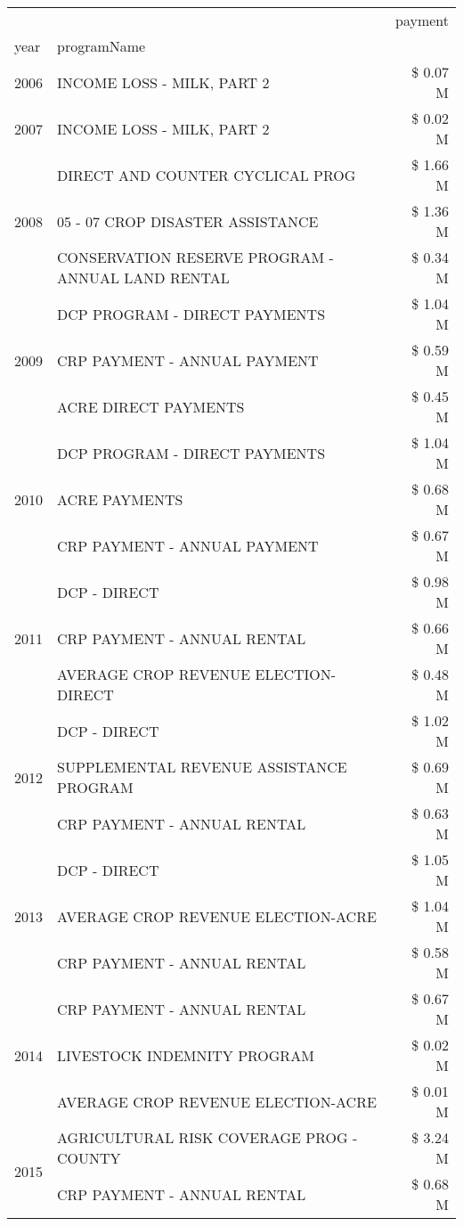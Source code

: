 \begin{tabular}{llr}
\toprule
 &  & payment \\
year & programName &  \\
\midrule
2006 & INCOME LOSS - MILK, PART 2 & \$ 0.07 M \\
\cline{1-3}
2007 & INCOME LOSS - MILK, PART 2 & \$ 0.02 M \\
\cline{1-3}
\multirow[t]{3}{*}{2008} & DIRECT AND COUNTER CYCLICAL PROG & \$ 1.66 M \\
 & 05 - 07 CROP DISASTER ASSISTANCE & \$ 1.36 M \\
 & CONSERVATION RESERVE PROGRAM - ANNUAL LAND RENTAL & \$ 0.34 M \\
\cline{1-3}
\multirow[t]{3}{*}{2009} & DCP PROGRAM - DIRECT PAYMENTS & \$ 1.04 M \\
 & CRP PAYMENT - ANNUAL PAYMENT & \$ 0.59 M \\
 & ACRE DIRECT PAYMENTS & \$ 0.45 M \\
\cline{1-3}
\multirow[t]{3}{*}{2010} & DCP PROGRAM - DIRECT PAYMENTS & \$ 1.04 M \\
 & ACRE PAYMENTS & \$ 0.68 M \\
 & CRP PAYMENT - ANNUAL PAYMENT & \$ 0.67 M \\
\cline{1-3}
\multirow[t]{3}{*}{2011} & DCP - DIRECT & \$ 0.98 M \\
 & CRP PAYMENT - ANNUAL RENTAL & \$ 0.66 M \\
 & AVERAGE CROP REVENUE ELECTION-DIRECT & \$ 0.48 M \\
\cline{1-3}
\multirow[t]{3}{*}{2012} & DCP - DIRECT & \$ 1.02 M \\
 & SUPPLEMENTAL REVENUE ASSISTANCE PROGRAM & \$ 0.69 M \\
 & CRP PAYMENT - ANNUAL RENTAL & \$ 0.63 M \\
\cline{1-3}
\multirow[t]{3}{*}{2013} & DCP - DIRECT & \$ 1.05 M \\
 & AVERAGE CROP REVENUE ELECTION-ACRE & \$ 1.04 M \\
 & CRP PAYMENT - ANNUAL RENTAL & \$ 0.58 M \\
\cline{1-3}
\multirow[t]{3}{*}{2014} & CRP PAYMENT - ANNUAL RENTAL & \$ 0.67 M \\
 & LIVESTOCK INDEMNITY PROGRAM & \$ 0.02 M \\
 & AVERAGE CROP REVENUE ELECTION-ACRE & \$ 0.01 M \\
\cline{1-3}
\multirow[t]{3}{*}{2015} & AGRICULTURAL RISK COVERAGE PROG - COUNTY & \$ 3.24 M \\
 & CRP PAYMENT - ANNUAL RENTAL & \$ 0.68 M \\

\end{tabular}
